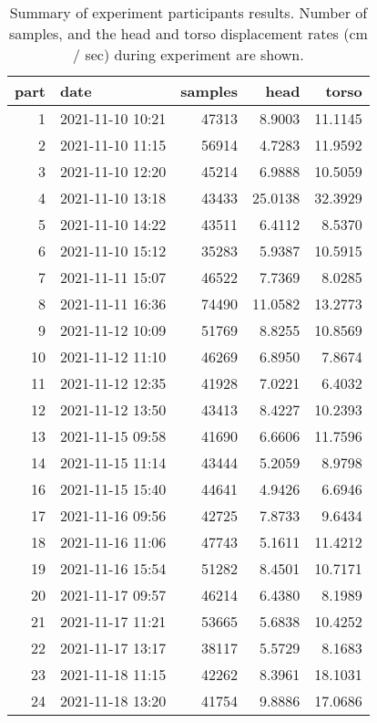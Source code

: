 \begin{table}
\centering
\caption{Summary of experiment participants results.  Number of samples, and the head and torso displacement rates (cm / sec) during experiment are shown.}
\label{table-subject-summary}
\begin{tabular}{rlrrr}
\toprule
part &             date & samples &    head &   torso \\
\midrule
   1 & 2021-11-10 10:21 &   47313 &  8.9003 & 11.1145 \\
   2 & 2021-11-10 11:15 &   56914 &  4.7283 & 11.9592 \\
   3 & 2021-11-10 12:20 &   45214 &  6.9888 & 10.5059 \\
   4 & 2021-11-10 13:18 &   43433 & 25.0138 & 32.3929 \\
   5 & 2021-11-10 14:22 &   43511 &  6.4112 &  8.5370 \\
   6 & 2021-11-10 15:12 &   35283 &  5.9387 & 10.5915 \\
   7 & 2021-11-11 15:07 &   46522 &  7.7369 &  8.0285 \\
   8 & 2021-11-11 16:36 &   74490 & 11.0582 & 13.2773 \\
   9 & 2021-11-12 10:09 &   51769 &  8.8255 & 10.8569 \\
  10 & 2021-11-12 11:10 &   46269 &  6.8950 &  7.8674 \\
  11 & 2021-11-12 12:35 &   41928 &  7.0221 &  6.4032 \\
  12 & 2021-11-12 13:50 &   43413 &  8.4227 & 10.2393 \\
  13 & 2021-11-15 09:58 &   41690 &  6.6606 & 11.7596 \\
  14 & 2021-11-15 11:14 &   43444 &  5.2059 &  8.9798 \\
  16 & 2021-11-15 15:40 &   44641 &  4.9426 &  6.6946 \\
  17 & 2021-11-16 09:56 &   42725 &  7.8733 &  9.6434 \\
  18 & 2021-11-16 11:06 &   47743 &  5.1611 & 11.4212 \\
  19 & 2021-11-16 15:54 &   51282 &  8.4501 & 10.7171 \\
  20 & 2021-11-17 09:57 &   46214 &  6.4380 &  8.1989 \\
  21 & 2021-11-17 11:21 &   53665 &  5.6838 & 10.4252 \\
  22 & 2021-11-17 13:17 &   38117 &  5.5729 &  8.1683 \\
  23 & 2021-11-18 11:15 &   42262 &  8.3961 & 18.1031 \\
  24 & 2021-11-18 13:20 &   41754 &  9.8886 & 17.0686 \\

\end{tabular}
\end{table}
